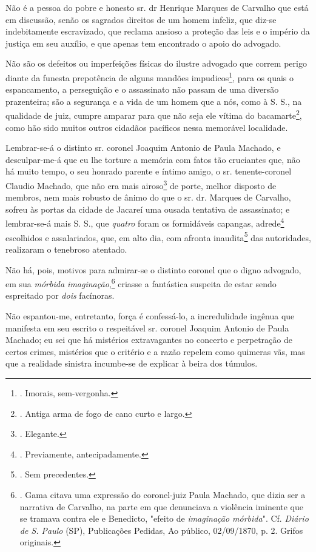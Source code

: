 Não é a pessoa do pobre e honesto sr. dr Henrique Marques de Carvalho
que está em discussão, senão os sagrados direitos de um homem infeliz,
que diz-se indebitamente escravizado, que reclama ansioso a proteção das
leis e o império da justiça em seu auxílio, e que apenas tem encontrado
o apoio do advogado.

Não são os defeitos ou imperfeições físicas do ilustre advogado que
correm perigo diante da funesta prepotência de alguns mandões
impudicos\footnote{. Imorais, sem-vergonha.}, para os quais o
espancamento, a perseguição e o assassinato não passam de uma diversão
prazenteira; são a segurança e a vida de um homem que a nós, como à S.
S., na qualidade de juiz, cumpre amparar para que não seja ele vítima do
bacamarte\footnote{. Antiga arma de fogo de cano curto e largo.}, como
hão sido muitos outros cidadãos pacíficos nessa memorável localidade.

Lembrar-se-á o distinto sr. coronel Joaquim Antonio de Paula Machado, e
desculpar-me-á que eu lhe torture a memória com fatos tão cruciantes
que, não há muito tempo, o seu honrado parente e íntimo amigo, o sr.
tenente-coronel Claudio Machado, que não era mais airoso\footnote{.
  Elegante.} de porte, melhor disposto de membros, nem mais robusto de
ânimo do que o sr. dr. Marques de Carvalho, sofreu às portas da cidade
de Jacareí uma ousada tentativa de assassinato; e lembrar-se-á mais S.
S., que \emph{quatro} foram os formidáveis capangas, adrede\footnote{.
  Previamente, antecipadamente.} escolhidos e assalariados, que, em alto
dia, com afronta inaudita\footnote{. Sem precedentes.} das autoridades,
realizaram o tenebroso atentado.

Não há, pois, motivos para admirar-se o distinto coronel que o digno
advogado, em sua \emph{mórbida imaginação},\footnote{. Gama citava uma
  expressão do coronel-juiz Paula Machado, que dizia ser a narrativa de
  Carvalho, na parte em que denunciava a violência iminente que se
  tramava contra ele e Benedicto, "efeito de \emph{imaginação mórbida}".
  Cf. \emph{Diário de S. Paulo} (SP), Publicações Pedidas, Ao público,
  02/09/1870, p. 2. Grifos originais.} criasse a fantástica suspeita de
estar sendo espreitado por \emph{dois} facínoras.

Não espantou-me, entretanto, força é confessá-lo, a incredulidade
ingênua que manifesta em seu escrito o respeitável sr. coronel Joaquim
Antonio de Paula Machado; eu sei que há mistérios extravagantes no
concerto e perpetração de certos crimes, mistérios que o critério e a
razão repelem como quimeras vãs, mas que a realidade sinistra incumbe-se
de explicar à beira dos túmulos.

